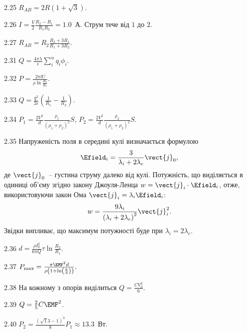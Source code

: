 \begin{Solution}{2.{25}}
	$R_{AB} = 2R (1 + \sqrt{3})$.
\end{Solution}
\begin{Solution}{2.{26}}
	$I = \frac{V}{2}\frac{R_2 - R_1}{R_1R_2} = 1.0$~А. Струм тече від $1$ до $2$.
\end{Solution}
\begin{Solution}{2.{27}}
	$R_{AB}  = R_2 \frac{R_2 + 3R_1}{R_1 + 3R_2}$.
\end{Solution}
\begin{Solution}{2.{31}}
	$Q = \frac{4\pi\lambda}{\epsilon}\sum\limits_i^n q_i\phi_i$.
\end{Solution}
\begin{Solution}{2.{32}}
	$P = \frac{2\pi l U}{\rho\ln\frac{R_2}{R_1}}$.
\end{Solution}
\begin{Solution}{2.{33}}
	$Q = \frac{q^2}{2\epsilon}\left( \frac{1}{R_1} - \frac{1}{R_2}\right) $.
\end{Solution}
\begin{Solution}{2.{34}}
	$P_1  = \frac{2V^2}{d} \frac{\rho_1}{(\rho_1 + \rho_2)^2}S$, $P_2  = \frac{2V^2}{d} \frac{\rho_2}{(\rho_1 + \rho_2)^2}S$.
\end{Solution}
\begin{Solution}{2.{35}}
	Напруженість поля в середині кулі визначається формулою
	\[
		\Efield_i = \frac{3}{\lambda_i + 2\lambda_e} \vect{j}_0,
	\]
	де $\vect{j}_0$~-- густина струму далеко від кулі.
	Потужність, що виділяється в одиниці об'єму згідно закону Джоуля-Ленца $w = \vect{j}_i\cdot\Efield_i$, отже, використовуючи закон Ома $ \vect{j}_i = \lambda_i\Efield_i$:
	\[
		w = \frac{9\lambda_i}{\left( \lambda_i + 2\lambda_e\right)^2} \vect{j}_i^2.
	\]
	Звідки випливає, що максимум потужності буде при $\lambda_i = 2\lambda_e$.
\end{Solution}
\begin{Solution}{2.{36}}
	$d = \frac{\rho I_0^2}{6\pi Q} \tau \ln\frac{R_2}{R_1}$.
\end{Solution}
\begin{Solution}{2.{37}}
	$P_{\max} = \frac{\pi\EMF^2 d}{\rho \left( 1 + \ln\left( \frac{b}{d}\right)  \right) }.$
\end{Solution}
\begin{Solution}{2.{38}}
	На кожному з опорів виділиться $Q = \frac{CV_0^2}{6}$.
\end{Solution}
\begin{Solution}{2.{39}}
	$Q = \frac25 C\EMF^2$.
\end{Solution}
\begin{Solution}{2.{40}}
	$P_2 = \frac{(\sqrt13 - 1)^3}{8}P_1 \approx 13.3$~Вт.
\end{Solution}
